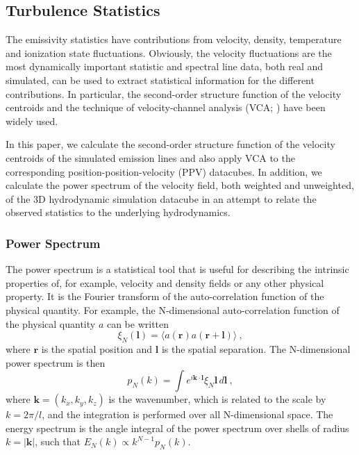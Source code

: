\documentclass[useAMS,usenatbib]{mn2e}
\begin{document}
\subsection{Turbulence Statistics}
\label{subsec:turbstats}
The emissivity statistics have contributions from velocity, density,
temperature and ionization state fluctuations. Obviously, the velocity
fluctuations are the most dynamically important statistic and spectral
line data, both real and simulated, can be used to extract statistical
information for the different contributions. In particular, the
second-order structure function of the velocity centroids and the
technique of velocity-channel analysis (VCA; \citealp{2000ApJ...537..720L}) have been widely used.

In this paper, we calculate the second-order structure function
of the velocity centroids of the simulated emission lines and also apply
VCA to the corresponding position-position-velocity (PPV)
datacubes. In addition, we calculate the power spectrum of the velocity field,
both weighted and unweighted, of the 3D hydrodynamic simulation
datacube in an attempt to relate the observed statistics to the
underlying hydrodynamics.

\subsubsection{Power Spectrum}

The power spectrum is a statistical tool that is useful for describing
the intrinsic properties of, for example, velocity and density fields
or any other physical property. It is the Fourier
transform of the auto-correlation function of the physical
quantity. For example, the N-dimensional auto-correlation function of the
physical quantity $a$ can be written
\begin{equation}
  \xi_N(\boldsymbol{l}) = \langle
  a(\mathbf{r})a(\mathbf{r}+\boldsymbol{l})\rangle \ ,
\label{eq:corrfn}
\end{equation}
where $\mathbf{r}$ is the spatial position and $\boldsymbol{l}$ is the
spatial separation. The N-dimensional power spectrum is then
\begin{equation}
  p_N(k) = \int e^{i\mathbf{k}\cdot\boldsymbol{l}} \xi_N{\boldsymbol{l}} \,
  d\boldsymbol{l} \ ,
\end{equation}
where $\mathbf{k}  = (k_x,k_y,k_z)$ is the wavenumber, which is related to the scale by
$k = 2\pi/l$, and the integration is performed over all N-dimensional
space. The energy spectrum is the angle integral of
the power spectrum over shells of radius $k = |\mathbf{k} |$, such that $E_N(k) \propto k^{N-1} p_N(k)$.
\end{document}
